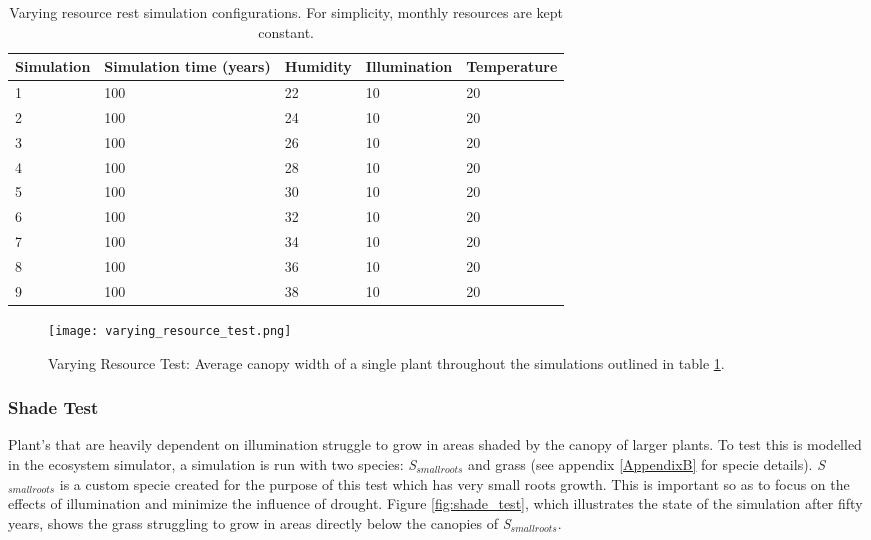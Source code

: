 \begin{table}[]
  \centering
	    \begin{tabular}{|p{3cm}|p{3cm}|p{3cm}|p{3cm}|p{3cm}|}
		\hline
		\textbf{Simulation} & \textbf{Simulation time (years)} & \textbf{Humidity} & \textbf{Illumination} & \textbf{Temperature}\\
		\hline         
		1 & 100 & 22 & 10 & 20\\           
		\hline       
		2 & 100 & 24 & 10 & 20\\
		\hline       
		3 & 100 & 26 & 10 & 20\\           
		\hline     
		4 & 100 & 28 & 10 & 20\\           
		\hline     
		5 & 100 & 30 & 10 & 20\\           
		\hline       
		6 & 100 & 32 & 10 & 20\\           
		\hline       
		7 & 100 & 34 & 10 & 20\\           
		\hline      
		8 & 100 & 36 & 10 & 20\\           
		\hline       
		9 & 100 & 38 & 10 & 20\\           
		\hline     
		\end{tabular}
		\caption{Varying resource rest simulation configurations. For simplicity, monthly resources are kept constant.}
		\label{tab:varying_resource_test_simulations}
\end{table}

\begin{figure}
\center
	\texttt{[image: varying\_resource\_test.png]}
	\caption{ Varying Resource Test: Average canopy width of a single plant throughout the simulations outlined in table \ref{tab:varying_resource_test_simulations}. }
	\label{fig:varying_resource_test}
\end{figure}

\subsubsection{Shade Test} \label{subsubsec:shade_test}

Plant's that are heavily dependent on illumination struggle to grow in areas shaded by the canopy of larger plants. To test this is modelled in the ecosystem simulator, a simulation is run with two species: \textit{S$_{smallroots}$} and grass (see appendix \ref{AppendixB} for specie details).  \textit{S$_{smallroots}$} is a custom specie created for the purpose of this test which has very small roots growth. This is important so as to focus on the effects of illumination and minimize the influence of drought. Figure \ref{fig:shade_test}, which illustrates the state of the simulation after fifty years, shows the grass struggling to grow in areas directly below the canopies of \textit{S$_{smallroots}$}.

